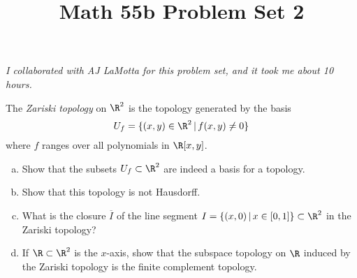 \documentclass[11pt,letterpaper]{article}
\title{\textbf{Math 55b Problem Set 2}}
\begin{document}
\maketitle

\hr
\begin{center}
    \textit{I collaborated with AJ LaMotta for this problem set, and it took me about 10 hours.}
\end{center}
\hr

\begin{problem}
    The {\em Zariski topology} on $\R^2$ is the topology generated by the basis $$U_f=\{(x,y)\in \R^2\,|\,f(x,y)\neq 0\}$$ where $f$ ranges over all polynomials in $\R[x,y]$. 
    \begin{enumerate}[(a)]
        \item Show that the subsets $U_f\subset \R^2$ are indeed a basis for a
        topology.
        \item Show that this topology is not Hausdorff.
        \item What is the closure $\overline{I}$ of the line segment $I=\{(x,0)\,|\,x\in
        [0,1]\}\subset \R^2$ in the Zariski topology?
        \item If $\R\subset \R^2$ is the $x$-axis, show that the subspace topology
        on $\R$ induced by the Zariski topology is the finite complement topology.
    \end{enumerate}
\end{problem}
\end{document}
